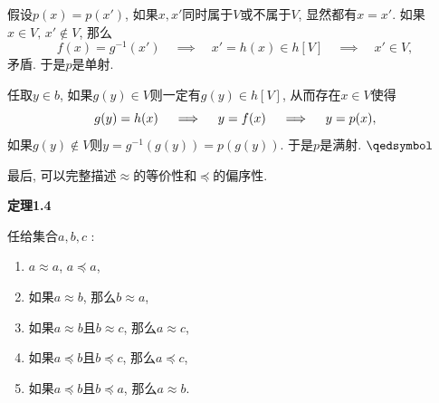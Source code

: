 \documentclass[UTF8]{ctexart}
\begin{document}
\vspace{3pt}
假设$p(x)=p(x')$, 如果$x,x'$同时属于$V$或不属于$V$, 显然都有$x=x'$.
如果$x\in V,\,x'\notin V$, 那么
\[
    f(x)=g^{-1}(x')\quad\implies\quad x'=h(x)\in h[V]
    \quad\implies\quad x'\in V,
\]
矛盾. 于是$p$是单射.

\vspace{3pt}
任取$y\in b$, 如果$g(y)\in V$则一定有$g(y)\in h[V]$, 从而存在$x\in V$使得
\[
    g(y)=h(x)\quad\implies\quad y=f(x)\quad\implies\quad y=p(x),\\[3pt]
\]
如果$g(y)\notin V$则$y=g^{-1}(g(y))=p(g(y))$. 于是$p$是满射. \hfill $\qedsymbol$

\vspace{20pt}

最后, 可以完整描述$\approx$的等价性和$\preccurlyeq$的偏序性.

\vspace{10pt}

\hypertarget{sec:定理1.4}{}
\noindent\textbf{定理1.4}

任给集合$a,b,c$ :
\begin{enumerate}
    \item $a\approx a$, $a\preccurlyeq a$,
    \item 如果$a\approx b$, 那么$b\approx a$,
    \item 如果$a\approx b$且$b\approx c$, 那么$a\approx c$,
    \item 如果$a\preccurlyeq b$且$b\preccurlyeq c$, 那么$a\preccurlyeq c$,
    \item 如果$a\preccurlyeq b$且$b\preccurlyeq a$, 那么$a\approx b$.
\end{enumerate}
\end{document}
